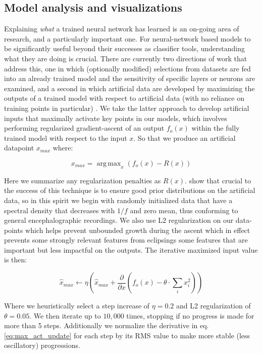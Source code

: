 \documentclass[fleqn,10pt]{wlscirep}
\DeclareMathOperator*{\argmaxA}{arg\,max}
\begin{document}
\subsection*{Model analysis and visualizations} \label{sec:max_act}

Explaining {\em what} a trained neural network has learned is an on-going area of research, and a particularly important one. For neural-network based models to be significantly useful beyond their successes as classifier tools, understanding what they are doing is crucial. There are currently two directions of work that address this, one in which (optionally modified) selections from datasets are fed into an already trained model and the sensitivity of specific layers or neurons are examined, and a second in which artificial data are developed by maximizing the outputs of a trained model with respect to artificial data (with no reliance on training points in particular) \cite{Yosinski2015}. We take the latter approach to develop artificial inputs that maximally activate key points in our models, which involves performing regularized gradient-ascent of an output $f_o(x)$ within the fully trained model with respect to the input $x$. So that we produce an artificial datapoint $x_{max}$ where:

\begin{equation} \label{eq:max_act}
  x_{max} = \argmaxA_x(f_o(x) - R(x))
\end{equation}

Here we summarize any regularization penalties as $R(x)$. \cite{Yosinski2015} show that crucial to the success of this technique is to ensure good prior distributions on the artificial data, so in this spirit we begin with randomly initialized data that have a spectral density that decreases with $1/f$ and zero mean, thus conforming to general encephalographic recordings. We also use L2 regularization on our data-points which helps prevent unbounded growth during the ascent which in effect prevents some strongly relevant features from eclipsings some features that are important but less impactful on the outputs. The iterative maximized input value is then:

\begin{equation} \label{eq:max_act_update}
  \hat{x}_{max} \leftarrow \eta \left(\hat{x}_{max} + \frac{\partial }{\partial x}(f_o(x) - \theta \cdot {}\sum_ix_i^2) \right)
\end{equation}

Where we heuristically select a step increase of $\eta = 0.2$ and L2 regularization of $\theta = 0.05$. We then iterate up to $10,000$ times, stopping if no progress is made for more than 5 steps. Additionally we normalize the derivative in eq. \ref{eq:max_act_update} for each step by its RMS value to make more stable (less oscillatory) progressions.
\end{document}
